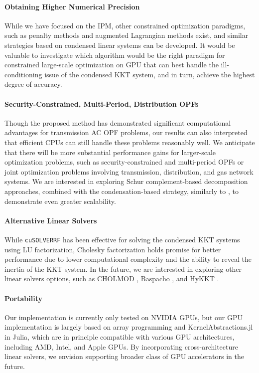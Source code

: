 \paragraph*{Obtaining Higher Numerical Precision}
While we have focused on the IPM, other constrained optimization
paradigms, such as penalty methods and augmented Lagrangian methods
exist, and similar strategies based on condensed linear systems can be
developed. It would be valuable to investigate which algorithm would
be the right paradigm for constrained large-scale optimization on GPU
that can best handle the ill-conditioning issue of the condensed KKT
system, and in turn, achieve the highest degree of accuracy.

\paragraph*{Security-Constrained, Multi-Period, Distribution OPFs}
Though the proposed method has demonstrated significant computational
advantages for transmission AC OPF problems, our results can also
interpreted that efficient CPUs can still handle these problems
reasonably well. We anticipate that there will be more substantial
performance gains for larger-scale optimization problems, such as
security-constrained and multi-period OPFs or joint optimization
problems involving transmission, distribution, and gas network
systems. We are interested in exploring Schur complement-based
decomposition approaches, combined with the condensation-based
strategy, similarly to \cite{pacaud2023parallel}, to demonstrate even
greater scalability.

\paragraph*{Alternative Linear Solvers}
While {\tt cuSOLVERRF} has been effective for solving the condensed KKT
systems using LU factorization, Cholesky factorization holds promise
for better performance due to lower computational complexity and the
ability to reveal the inertia of the KKT system. In the future, we are
interested in exploring other linear solvers options, such as CHOLMOD
\cite{chen2008algorithm}, Baspacho \cite{pineda2022theseus}, and HyKKT
\cite{regev2023hykkt}.

\paragraph*{Portability}
Our implementation is currently only tested on NVIDIA GPUs, but our
GPU implementation is largely based on array programming and
KernelAbstractions.jl in Julia, which are in principle  compatible with
various GPU architectures, including AMD, Intel, and Apple GPUs. By
incorporating cross-architecture linear solvers, we envision
supporting broader class of GPU accelerators in the future.


